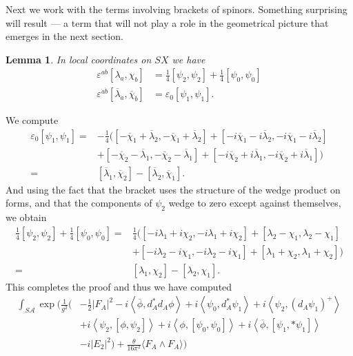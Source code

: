 \documentclass[twoside]{amsart}
\newtheorem{lemma}{Lemma}
\renewcommand{\epsilon}{\varepsilon}
\newcommand{\enm}[1]{\ensuremath{#1}}
\renewcommand{\aa}{\enm{\mathcal{A}}}
\newcommand{\sa}{\enm{S\aa}}
\newcommand{\ip}[2]{\enm{\left<#1,#2\right>}}
\renewcommand{\bar}[1]{\overline{#1}}
\renewcommand{\epsilon}{\varepsilon}
\newcommand{\cbi}[1]{\enm{\bar{\chi}_{\dot{#1}}}}
\newcommand{\lbi}[1]{\enm{\bar{\lambda}_{\dot{#1}}}}
\begin{document}
Next we work with the terms involving brackets of spinors.  Something
surprising will result --- a term that will not play a role in the
geometrical picture that emerges in the next section.
\begin{lemma}
    \label{lemma:brackets}
    In local coordinates on \( SX \) we have
    \begin{align}
        \epsilon^{ab}[\lambda_{a},\chi_{b}] &= \frac{1}{4}[\psi_{2},\psi_{2}] +
        \frac{1}{4}[\psi_{0},\psi_{0}] \\
        \epsilon^{\dot{a}\dot{b}}[\lbi{a},\cbi{b}] &=
        \epsilon_{0}[\psi_{1},\psi_{1}].
    \end{align}
\end{lemma}
\proof We compute
\begin{align*}
    \epsilon_{0}[\psi_{1},\psi_{1}] =&
    -\frac{1}{4}([-\cbi{1}+\lbi{2}, -\cbi{1}+\lbi{2}] +
    [-i\cbi{1}-i\lbi{2}, -i\cbi{1}-i\lbi{2}] \\ &+
    [-\cbi{2}-\lbi{1}, -\cbi{2}-\lbi{1}]+
    [-i\cbi{2}+i\lbi{1}, -i\cbi{2}+i\lbi{1}]) \\
    =& [\lbi{1},\cbi{2}] - [\lbi{2},\cbi{1}].
\end{align*}
And using the fact that the bracket uses the structure of the wedge
product on forms, and that the components of \( \psi_{2} \) wedge to
zero except against themselves, we obtain
\begin{align*}
    \frac{1}{4}[\psi_{2},\psi_{2}]+\frac{1}{4}[\psi_{0},\psi_{0}] =&
    \frac{1}{4}([-i\lambda_{1} + i\chi_{2}, -i\lambda_{1} + i\chi_{2}] +
    [\lambda_{2} - \chi_{1}, \lambda_{2} - \chi_{1}] \\
    &+
    [-i\lambda_{2} - i\chi_{1}, -i\lambda_{2} - i\chi_{1}] +
    [\lambda_{1} + \chi_{2}, \lambda_{1} + \chi_{2}]) \\
    =& [\lambda_{1},\chi_{2}]-[\lambda_{2},\chi_{1}].
\end{align*}
This completes the proof and thus we have computed
\begin{align}
    \int_{\sa} %
  \exp\Big(\frac{1}{g^{2}}%
    \Big(
    &-\frac{1}{2}|F_{A}|^{2}
    - i\ip{\bar{\phi}}{d_{A}^{*}d_{A}\phi}
    +i\ip{\psi_{0}}{d_{A}^{*}\psi_{1}}
    + i\ip{\psi_{2}}{(d_{A}\psi_{1})^{+}}   \nonumber\\
    &+ i\ip{\psi_{2}}{[\phi, \psi_{2}]}
    + i\ip{\phi}{[\psi_{0},\psi_{0}]}
    + i\ip{\bar{\phi}}{[\psi_{1}, *\psi_{1}]} \\
    &- i|E_{2}|^{2}\Big)
    + \frac{\theta}{16\pi^{2}}\langle F_{A}\wedge F_{A}\rangle
    \Big)
\end{align}
\end{document}
